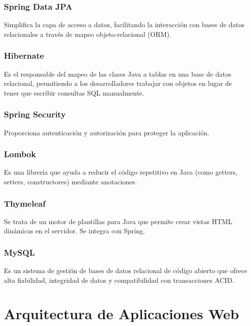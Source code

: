 \subsubsection{Spring Data JPA~\cite{spring-data-jpa}}
Simplifica la capa de acceso a datos, facilitando la interacción con bases de datos relacionales a través de mapeo objeto-relacional (ORM).

\subsubsection{Hibernate~\cite{hibernate}}
Es el responsable del mapeo de las clases Java a tablas en una base de datos relacional, permitiendo a los desarrolladores trabajar con objetos en lugar de tener que escribir consultas SQL manualmente.

\subsubsection{Spring Security~\cite{spring-security}}
Proporciona autenticación y autorización para proteger la aplicación.

\subsubsection{Lombok~\cite{lombok}}
Es una librería que ayuda a reducir el código repetitivo en Java (como getters, setters, constructores) mediante anotaciones.

\subsubsection{Thymeleaf~\cite{thymeleaf}}
Se trata de un motor de plantillas para Java que permite crear vistas HTML dinámicas en el servidor. Se integra con Spring.

\subsubsection{MySQL~\cite{mysql}}
Es un sistema de gestión de bases de datos relacional de código abierto que ofrece alta fiabilidad, integridad de datos y compatibilidad con transacciones ACID.

\section{Arquitectura de Aplicaciones Web}

